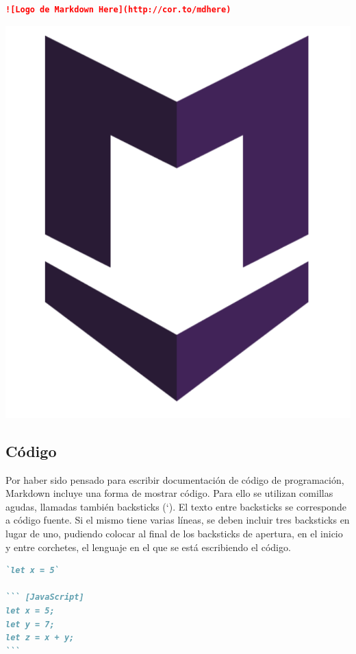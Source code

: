 \begin{lstlisting}[language=Markdown]
![Logo de Markdown Here](http://cor.to/mdhere)
\end{lstlisting}

\includegraphics[scale=0.4]{apendices/markdown/imagenes/md_imagen.png}

\subsection*{Código}

Por haber sido pensado para escribir documentación de código de programación,
Markdown incluye una forma de mostrar código. Para ello se utilizan comillas
agudas, llamadas también backsticks (`). El texto entre backsticks se corresponde
a código fuente. Si el mismo tiene varias líneas, se deben incluir tres backsticks
en lugar de uno, pudiendo colocar al final de los backsticks de apertura,
en el inicio y entre corchetes, el lenguaje en el que se está escribiendo el código.

\begin{lstlisting}[language=Markdown]
`let x = 5`

``` [JavaScript]
let x = 5;
let y = 7;
let z = x + y;
```
\end{lstlisting}

